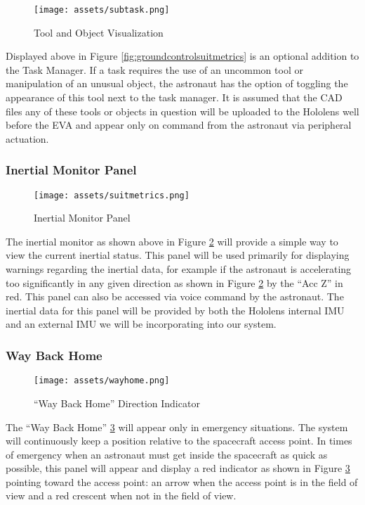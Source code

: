 \documentclass{article}
\let\Oldsubsubsection\subsubsection
\renewcommand{\subsubsection}{\FloatBarrier\Oldsubsubsection}
\begin{document}
\begin{figure}[!htb]
  \centering
  \texttt{[image: assets/subtask.png]}
  \caption{Tool and Object Visualization}
  \label{fig:subtask}
\end{figure}

Displayed above in Figure \ref{fig:groundcontrolsuitmetrics} is an optional addition to the Task Manager. If a task requires the use of an uncommon tool or manipulation of an unusual object, the astronaut has the option of toggling the appearance of this tool next to the task manager. It is assumed that the CAD files any of these tools or objects in question will be uploaded to the Hololens well before the EVA and appear only on command from the astronaut via peripheral actuation.

\subsubsection{Inertial Monitor Panel}

\begin{figure}[!htb]
  \centering
  \texttt{[image: assets/suitmetrics.png]}
  \caption{Inertial Monitor Panel}
  \label{fig:suitmetrics}
\end{figure}

The inertial monitor as shown above in Figure \ref{fig:suitmetrics} will provide a simple way to view the current inertial status. This panel will be used primarily for displaying warnings regarding the inertial data, for example if the astronaut is accelerating too significantly in any given direction as shown in Figure \ref{fig:suitmetrics} by the “Acc Z” in red.  This panel can also be accessed via voice command by the astronaut. The inertial data for this panel will be provided by both the Hololens internal IMU and an external IMU we will be incorporating into our system.

\subsubsection{Way Back Home}

\begin{figure}[!htb]
  \centering
  \texttt{[image: assets/wayhome.png]}
  \caption{“Way Back Home” Direction Indicator}
  \label{fig:wayhome}
\end{figure}

The “Way Back Home” \ref{fig:wayhome} will appear only in emergency situations. The system will continuously keep a position relative to the spacecraft access point. In times of emergency when an astronaut must get inside the spacecraft as quick as possible, this panel will appear and display a red indicator as shown in Figure \ref{fig:wayhome} pointing toward the access point: an arrow when the access point is in the field of view and a red crescent when not in the field of view. 
\end{document}
